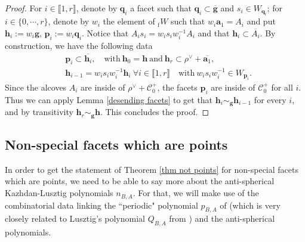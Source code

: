 \documentclass[11pt]{amsart}
\theoremstyle{plain}
\theoremstyle{remark}
\numberwithin{equation}{section}
\begin{document}
\begin{proof}
		For $i\in\llbracket 1,r\rrbracket$, denote by $\mathbf{q}_i$ a facet such that $\mathbf{q}_i\subset\overline{\mathbf{g}}$ and $s_i\in W_{\mathbf{q}_i}$; for $i\in\{0,\cdots,r\}$, denote by $w_i$ the element of $_{\mathrm{f}}W$ such that $w_i\mathbf{a}_1=A_i$ and put $\mathbf{h}_i:=w_i\mathbf{g}$, $\mathbf{p}_i:=w_i\mathbf{q}_i$. Notice that $A_is_i=w_is_iw_i^{-1}A_i$ and that $\mathbf{h}_i\subset \overline{A_i}$.  By construction, we have the following data
		\begin{align*}
			&\mathbf{p}_i\subset\overline{\mathbf{h}_i},\quad \text{with}~ \mathbf{h}_0=\mathbf{h}~\text{and}~\mathbf{h}_r\subset\rho^\vee+\overline{\mathbf{a}_1},\\
			&\mathbf{h}_{i-1}=w_is_iw_i^{-1} \mathbf{h}_{i}~\forall i\in\llbracket 1,r\rrbracket\quad\text{with}~w_is_iw_i^{-1}\in W_{\mathbf{p}_i}.
		\end{align*} 
		Since the alcoves $A_i$ are inside of $\rho^\vee+ \mathscr{C}^+_0$, the facets $\mathbf{p}_i$ are inside of $\mathscr{C}^+_0$ for all $i$. Thus we can apply Lemma \ref{desending facets} to get that $\mathbf{h}_{i}\sim_{\mathbf{g}}\mathbf{h}_{i-1}$ for every $i$, and by transitivity $\mathbf{h}_r\sim_{\mathbf{g}}\mathbf{h}$. This concludes the proof.
	\end{proof}
	
	\subsection{Non-special facets which are points}\label{Facets which are points}
	In order to get the statement of Theorem \ref{thm not points} for non-special facets which are points, we need to be able to say more about the anti-spherical Kazhdan-Lusztig polynomials $n_{B,A}$. For that, we will make use of the combinatorial data linking the ``periodic" polynomial $p_{B,A}$ of \cite[Remark 4.4]{Soergel1997KazhdanLusztigPA} (which is very closely related to Lusztig's polynomial $Q_{B,A}$ from \cite{LUSZTIG1980121}) and the anti-spherical polynomials. 
	
\end{document}
